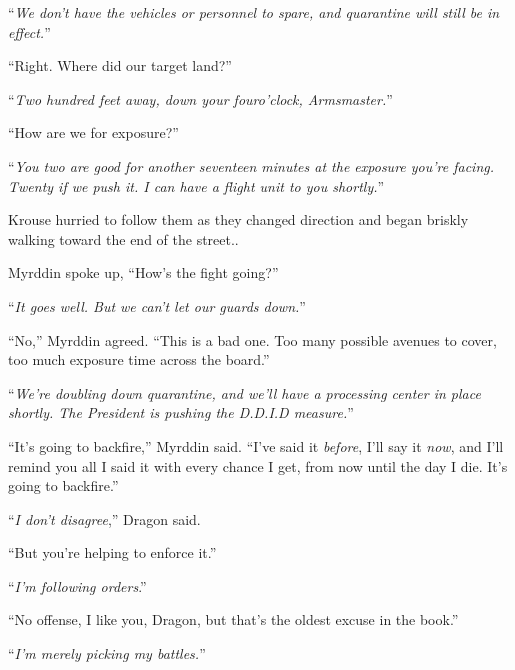 ``\emph{We don't have the vehicles or personnel to spare, and quarantine will still be in effect.}''



``Right.  Where did our target land?''



``\emph{Two hundred feet away, down your four}\emph{o'clock, Armsmaster.}''



``How are we for exposure?''



``\emph{You two are good for another seventeen minutes at the exposure you're facing.  Twenty if we push it.  I can have a flight unit to you shortly.}''



Krouse hurried to follow them as they changed direction and began briskly walking toward the end of the street..



Myrddin spoke up, ``How's the fight going?''



``\emph{It goes well.  But we can't let our guards down.}''



``No,'' Myrddin agreed.  ``This is a bad one.  Too many possible avenues to cover, too much exposure time across the board.''



``\emph{We're doubling down quarantine, and we'll have a processing center in place shortly.  The President is pushing the D.D.I.D measure.}''



``It's going to backfire,'' Myrddin said.  ``I've said it \emph{before}, I'll say it \emph{now}, and I'll remind you all I said it with every chance I get, from now until the day I die.  It's going to backfire.''



``\emph{I don't disagree},'' Dragon said.



``But you're helping to enforce it.''



``\emph{I'm following orders}.''



``No offense, I like you, Dragon, but that's the oldest excuse in the book.''



``\emph{I'm merely picking my battles.}''



